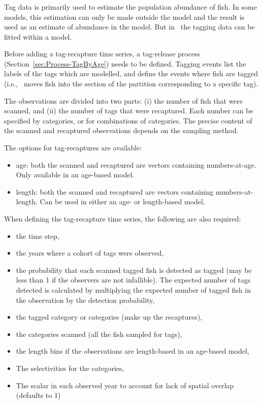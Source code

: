 \ifAgeBased
\subsubsection{} \label{sec:Observation-TagRecaptures} \label{sec:Observation-TagRecaptureByAge} \label{sec:Observation-TagRecaptureByLength}

Tag data is primarily used to estimate the population abundance of fish. In some models, this estimation can only be made outside the model and the result is used as an estimate of abundance in the model. But in \CNAME\ the tagging data can be fitted within a model.

Before adding a tag-recapture time series, a tag-release process (Section~\ref{sec:Process-TagByAge}) needs to be defined. Tagging events list the labels of the tags which are modelled, and define the events where fish are tagged (i.e., \CNAME\ moves fish into the section of the partition corresponding to a specific tag).

The observations are divided into two parts: (i) the number of fish that were scanned, and (ii) the number of tags that were recaptured. Each number can be specified by categories, or for combinations of categories. The precise content of the scanned and recaptured observations depends on the sampling method.

The options for tag-recaptures are available:

\begin{itemize}
	\item age: both the scanned and recaptured are vectors containing numbers-at-age. Only available in an age-based model. 
	\item length: both the scanned and recaptured are vectors containing numbers-at-length. Can be used in either an age- or length-based model.
\end{itemize}

When defining the tag-recapture time series, the following are also required:

\begin{itemize}
	\item the time step,
	\item the years where a cohort of tags were observed,
	\item the probability that each scanned tagged fish is detected as tagged (may be less than 1 if the observers are not infallible). The expected number of tags detected is calculated by multiplying the expected number of tagged fish in the observation by the detection probability,
	\item the tagged category or categories (make up the recaptures),
	\item the categories scanned (all the fish sampled for tags),
	\item the length bins if the observations are length-based in an age-based model,
	\item The selectivities for the categories,
	\item The scalar in each observed year to account for lack of spatial overlap (defaults to 1)
\end{itemize}


